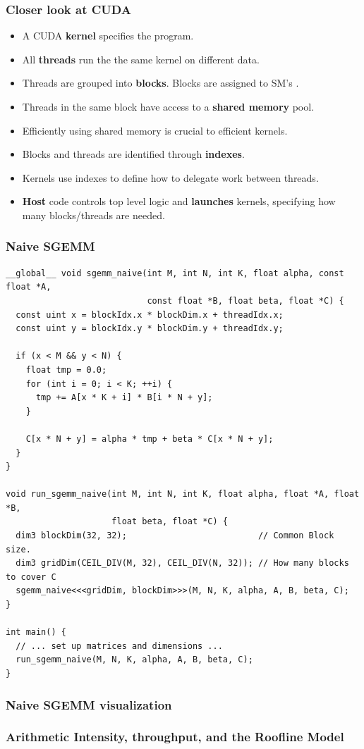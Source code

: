 \documentclass{beamer}
\begin{document}
\begin{frame}
  \frametitle{Closer look at CUDA}
  \begin{itemize}
    \item A CUDA \textbf{kernel} specifies the program.
    \item All \textbf{threads} run the the same kernel on different data.
    \item Threads are grouped into \textbf{blocks}. Blocks are assigned to SM's .
    \item Threads in the same block have access to a \textbf{shared memory} pool.
    \item Efficiently using shared memory is crucial to efficient kernels.
  \end{itemize}

  \begin{itemize}
    \item Blocks and threads are identified through \textbf{indexes}.
    \item Kernels use indexes to define how to delegate work between threads.
    \item \textbf{Host} code controls top level logic and \textbf{launches} kernels, specifying how many blocks/threads are needed.
  \end{itemize}

\end{frame}

\begin{frame}[fragile]
  \frametitle{Naive SGEMM}

  \begin{lstlisting}[basicstyle=\ttfamily\tiny]
__global__ void sgemm_naive(int M, int N, int K, float alpha, const float *A,
                            const float *B, float beta, float *C) {
  const uint x = blockIdx.x * blockDim.x + threadIdx.x;
  const uint y = blockIdx.y * blockDim.y + threadIdx.y;

  if (x < M && y < N) {
    float tmp = 0.0;
    for (int i = 0; i < K; ++i) {
      tmp += A[x * K + i] * B[i * N + y];
    }

    C[x * N + y] = alpha * tmp + beta * C[x * N + y];
  }
}

void run_sgemm_naive(int M, int N, int K, float alpha, float *A, float *B,
                     float beta, float *C) {
  dim3 blockDim(32, 32);                          // Common Block size.
  dim3 gridDim(CEIL_DIV(M, 32), CEIL_DIV(N, 32)); // How many blocks to cover C
  sgemm_naive<<<gridDim, blockDim>>>(M, N, K, alpha, A, B, beta, C);
}

int main() {
  // ... set up matrices and dimensions ...
  run_sgemm_naive(M, N, K, alpha, A, B, beta, C);
}
  \end{lstlisting}

\end{frame}

\begin{frame}
  \frametitle{Naive SGEMM visualization}

\end{frame}

\begin{frame}
  \frametitle{Arithmetic Intensity, throughput, and the Roofline Model}
\end{frame}
\end{document}
